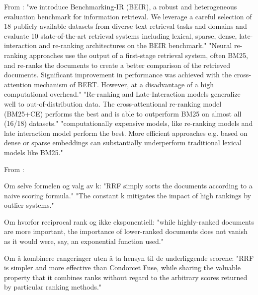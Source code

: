 From \parencite{thakur2021beir_heterogenous_benchmark_zero_shot_evaluation_ir_models}:
"we introduce Benchmarking-IR (BEIR), a robust and heterogeneous evaluation benchmark for information retrieval. We leverage a careful selection of 18 publicly available datasets from diverse text retrieval tasks and domains and evaluate 10 state-of-the-art retrieval systems including lexical, sparse, dense, late-interaction and re-ranking architectures on the BEIR benchmark."
"Neural re-ranking approaches use the output of a first-stage retrieval system, often BM25, and re-ranks the documents to create a better comparison of the retrieved documents. Significant improvement in performance was achieved with the cross-attention mechanism of BERT. However, at a disadvantage of a high computational overhead."
"Re-ranking and Late-Interaction models generalize well to out-of-distribution data. The cross-attentional re-ranking model (BM25+CE) performs the best and is able to outperform BM25 on almost all (16/18) datasets."
"computationally expensive models, like re-ranking models and late interaction model perform the best. More efficient approaches e.g. based on dense or sparse embeddings can substantially underperform traditional lexical models like BM25."

From \parencite{cormack2009reciprocal_rank_fusion}:

Om selve formelen og valg av k:
"RRF simply sorts the documents according to a naive scoring formula."
"The constant k mitigates the impact of high rankings by outlier systems."

Om hvorfor reciprocal rank og ikke eksponentiell:
"while highly-ranked documents are more important, the importance of lower-ranked documents does not vanish as it would were, say, an exponential function used."

Om å kombinere rangeringer uten å ta hensyn til de underliggende scorene:
"RRF is simpler and more effective than Condorcet Fuse, while sharing the valuable property that it combines ranks without regard to the arbitrary scores returned by particular ranking methods."
